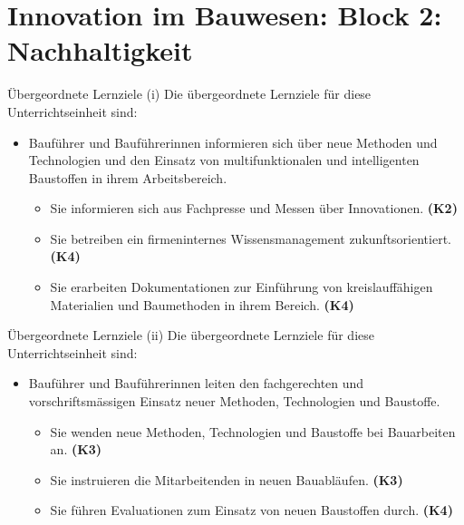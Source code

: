 \section{Innovation im Bauwesen: Block 2: Nachhaltigkeit}
\BlueSectionSlide


\begin{frame}{Übergeordnete Lernziele (i)}
    Die übergeordnete Lernziele für diese Unterrichtseinheit sind:
    \begin{myLernziele}
        \begin{itemize}
            \item Bauführer und Bauführerinnen informieren sich über neue Methoden und Technologien und den Einsatz von
                  multifunktionalen und intelligenten Baustoffen in ihrem Arbeitsbereich.
                  \begin{itemize}
                      \item Sie informieren sich aus Fachpresse und Messen über Innovationen. \textbf{(K2)}
                      \item Sie betreiben ein firmeninternes Wissensmanagement zukunftsorientiert. \textbf{(K4)}
                      \item Sie erarbeiten Dokumentationen zur Einführung von kreislauffähigen Materialien und Baumethoden
                            in ihrem Bereich. \textbf{(K4)}
                  \end{itemize}
        \end{itemize}

    \end{myLernziele}
\end{frame}
\begin{frame}{Übergeordnete Lernziele (ii)}
    Die übergeordnete Lernziele für diese Unterrichtseinheit sind:
    \begin{myLernziele}
        \begin{itemize}
            \item Bauführer und Bauführerinnen leiten den fachgerechten und vorschriftsmässigen Einsatz neuer Methoden, Technologien und Baustoffe.
                  \begin{itemize}
                      \item Sie wenden neue Methoden, Technologien und Baustoffe bei Bauarbeiten an. \textbf{(K3)}
                      \item Sie instruieren die Mitarbeitenden in neuen Bauabläufen. \textbf{(K3)}
                      \item Sie führen Evaluationen zum Einsatz von neuen Baustoffen durch. \textbf{(K4)}
                  \end{itemize}
        \end{itemize}

    \end{myLernziele}
\end{frame}





